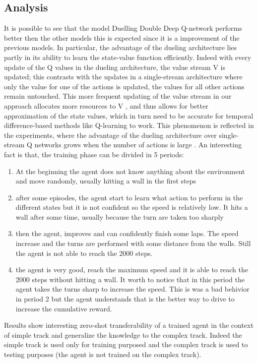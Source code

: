 \documentclass[14pt]{extarticle}
\def\sp{\vspace{5pt}}
\def\pp{\vspace{10pt}\newline}
\def\ppn{\vspace{10pt}}
\begin{document}
\begin{flushleft}
\subsection{Analysis}
\sp
It is possible to see that the model Duelling Double Deep Q-network performs better then the other models this is expected since it is a improvement of the previous models. 
\pp
In particular, the advantage of the dueling architecture lies partly in its ability to learn the state-value function efficiently. Indeed with every update of the Q values in the dueling architecture, the value stream V is updated; this contrasts with the updates in a single-stream architecture where only the value for one of the actions is updated, the values for all other actions remain untouched. This more frequent updating of the value stream in our approach allocates more resources to V , and thus allows for better approximation of the state values, which in turn need to be accurate for temporal difference-based methods like Q-learning to work. This phenomenon is reflected in the experiments, where the advantage of the dueling architecture over single-stream Q networks grows when the number of actions is large \cite{DDDQN1}.
\pp
An interesting fact is that, the training phase can be divided in 5 periods:
\begin{enumerate}
\item At the beginning the agent does not know anything about the environment and move randomly, usually hitting a wall in the first steps
\item after some episodes, the agent start to learn what action to perform in the different states but it is not confident so the speed is relatively low. It hits a wall after some time, usually because the turn are taken too sharply
\item then the agent, improves and can confidently finish some laps. The speed increase and the turns are performed with some distance from the walls. Still the agent is not able to reach the 2000 steps.
\item the agent is very good, reach the maximum speed and it is able to reach the 2000 steps without hitting a wall. It worth to notice that in this period the agent takes the turns sharp to increase the speed. This is was a bad behivior in period 2 but the agent understands that is the better way to drive to increase the cumulative reward.
\end{enumerate}
\ppn
Results show interesting zero-shot transferability \cite{Zero-shot} of a trained agent in the context of simple track and generalize the knowledge to the complex track. Indeed the simple track is used only for training purposed and the complex track is used to testing purposes (the agent is not trained on the complex track).



\end{flushleft}
\end{document}
